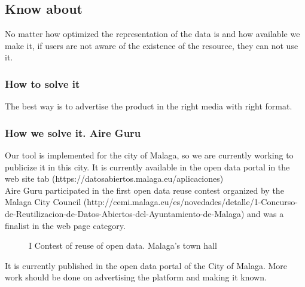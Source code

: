 \subsection{Know about}

No matter how optimized the representation of the data is and how available we make it, if users are not aware
 of the existence of the resource, they can not use it.

\subsubsection{How to solve it} 
The best way is to advertise the product in the right media with right format.
\subsubsection{How we solve it. Aire Guru} 
Our tool is implemented for the city of Malaga, so we are currently working to publicize it in this city.
It is currently available in the open data portal in the web site tab (https://datosabiertos.malaga.eu/aplicaciones) \\
Aire Guru participated in the first open data reuse contest organized by the Malaga City Council (http://cemi.malaga.eu/es/novedades/detalle/1-Concurso-de-Reutilizacion-de-Datos-Abiertos-del-Ayuntamiento-de-Malaga)
and was a finalist in the web page category.


\begin{figure}[ht]
    \centering
   \hfill
 
    \caption{I Contest of reuse of open data. Malaga's town hall}
    \end{figure}

\begin{itemize}
    \done It is currently published in the open data portal of the City of Malaga.
\crossed More work should be done on advertising the platform and making it known.
\end{itemize}
\newpage